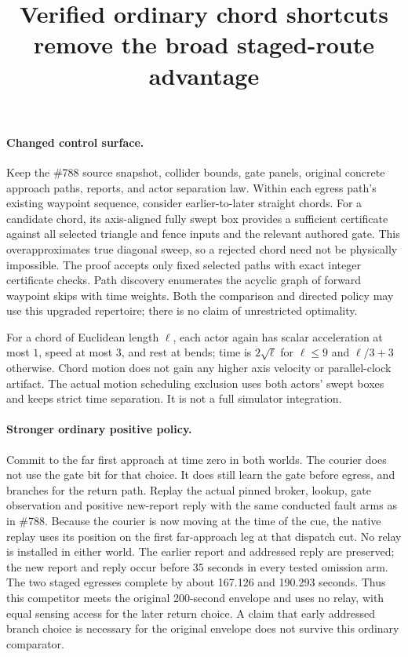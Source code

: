 \documentclass{article}
\begin{document}
\title{Verified ordinary chord shortcuts remove the broad staged-route advantage}
\maketitle

\paragraph{Changed control surface.}
Keep the \#788 source snapshot, collider bounds, gate panels,
original concrete approach paths, reports, and actor separation
law. Within each egress path's existing waypoint sequence,
consider earlier-to-later straight chords. For a candidate
chord, its axis-aligned fully swept box provides a sufficient
certificate against all selected triangle and fence inputs and
the relevant authored gate. This overapproximates true diagonal
sweep, so a rejected chord need not be physically impossible.
The proof accepts only fixed selected paths with exact integer
certificate checks. Path discovery enumerates the acyclic graph
of forward waypoint skips with time weights. Both the comparison
and directed policy may use this upgraded repertoire; there is
no claim of unrestricted optimality.

For a chord of Euclidean length \(\ell\), each actor again has
scalar acceleration at most \(1\), speed at most \(3\), and rest
at bends; time is \(2\sqrt{\ell}\) for \(\ell\le9\) and
\(\ell/3+3\) otherwise. Chord motion does not gain any higher
axis velocity or parallel-clock artifact. The actual motion
scheduling exclusion uses both actors' swept boxes and keeps
strict time separation. It is not a full simulator integration.

\paragraph{Stronger ordinary positive policy.}
Commit to the far first approach at time zero in both worlds.
The courier does not use the gate bit for that choice. It does
still learn the gate before egress, and branches for the
return path. Replay the actual pinned broker, lookup, gate
observation and positive new-report reply with the same
conducted fault arms as in \#788. Because the courier is now
moving at the time of the cue, the native replay uses its
position on the first far-approach leg at that dispatch cut.
No relay is installed in either world. The earlier report and
addressed reply are preserved; the new report and reply occur
before 35 seconds in every tested omission arm. The two staged
egresses complete by about 167.126 and 190.293 seconds.
Thus this competitor meets the original 200-second envelope
and uses no relay, with equal sensing access for the later
return choice. A claim that early addressed branch choice is
necessary for the original envelope does not survive this
ordinary comparator.
\end{document}
